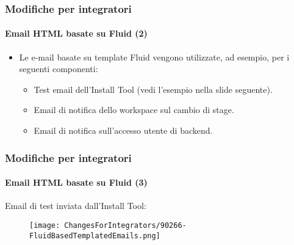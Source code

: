 
\begin{frame}[fragile]
	\frametitle{Modifiche per integratori}
	\framesubtitle{Email HTML basate su Fluid (2)}

	\begin{itemize}
		\item Le e-mail basate su template Fluid vengono utilizzate, ad esempio, per i seguenti componenti:

			\begin{itemize}
				\item Test email dell'Install Tool (vedi l'esempio nella slide seguente).
				\item Email di notifica dello workspace sul cambio di stage.
				\item Email di notifica sull'accesso utente di backend.
			\end{itemize}

	\end{itemize}

\end{frame}


\begin{frame}[fragile]
	\frametitle{Modifiche per integratori}
	\framesubtitle{Email HTML basate su Fluid (3)}

	Email di test inviata dall'Install Tool:

	\begin{figure}
		\texttt{[image: ChangesForIntegrators/90266-FluidBasedTemplatedEmails.png]}
	\end{figure}

\end{frame}



